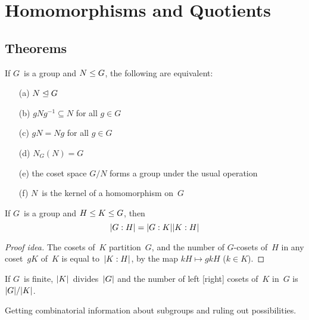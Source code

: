 %
%
%
\section{Homomorphisms and Quotients}
\subsection*{Theorems}
\begin{thm}[Normality]
If \(G\)~is a group and \(N\subgroupeq G\), the following are equivalent:
\begin{enumerate}[itemsep=0pt]
\item[(a)] \(N\normsubgroupeq G\)
\item[(b)] \(gNg^{-1}\subseteq N\) for all \(g\in G\)
\item[(c)] \(gN=Ng\) for all \(g\in G\)
\item[(d)] \(N_G(N)=G\)
\item[(e)] the coset space \(G/N\) forms a group under the usual operation
\item[(f)] \(N\)~is the kernel of a homomorphism on~\(G\)
\end{enumerate}
\end{thm}

\begin{thm}
If \(G\)~is a group and \(H\subgroupeq K\subgroupeq G\), then
\[\idx{H}{G}=\idx{K}{G}\idx{H}{K}\]
\end{thm}
\begin{proof}[Proof idea]
The cosets of~\(K\) partition~\(G\), and the number of \(G\)-cosets of~\(H\) in any coset~\(gK\) of~\(K\) is equal to~\(\idx{H}{K}\), by the map \(kH\mapsto gkH\) (\(k\in K\)).
\end{proof}

\begin{cor}[Lagrange]
If \(G\)~is finite, \(\ord{K}\)~divides~\(\ord{G}\) and the number of left [right] cosets of~\(K\) in~\(G\) is \(\ord{G}/\ord{K}\).
\end{cor}
\begin{app}
Getting combinatorial information about subgroups and ruling out possibilities.
\end{app}

